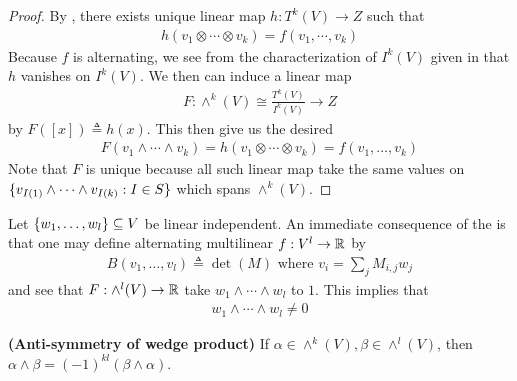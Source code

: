 \documentclass{report}
\begin{document}
\begin{proof}
By ,  there exists unique linear map $h:T^k(V)\rightarrow Z$ such that 
 \begin{align*}
h(v_1 \otimes  \cdots \otimes  v_k)=f(v_1,\cdots ,v_k)
\end{align*}
Because $f$ is alternating, we see from the characterization of $I^k(V)$ given in  that $h$ vanishes on $I^k(V)$. We then can induce a linear map 
\begin{align*}
F:\wedge^k (V)\cong \frac{T^k(V)}{I^k(V)} \rightarrow Z 
\end{align*}
by $F([x])\triangleq h(x)$. This then give us the desired  
\begin{align*}
F(v_1 \wedge  \cdots \wedge  v_k )=h(v_1\otimes  \cdots \otimes  v_k)=f(v_1,\dots ,v_k)
\end{align*}
Note that $F$ is unique because all such linear map take the same values on  $\{ v_{I(1)}\wedge  \cdots \wedge  v_{I(k)}:I \in S  \}$ which spans $\wedge ^k(V) $. 
\end{proof}
\begin{mdframed}
Let $\{ w_1,\dots ,w_l \}\subseteq V$ be linear independent. An immediate consequence of the  is that one may define alternating multilinear $f:V^l\rightarrow \mathbb{R}$ by 
\begin{align*}
B(v_1,\dots ,v_l)\triangleq \operatorname{det}(M)\text{ where }v_i= \sum_j M_{i,j}w_j
\end{align*}
and see that $F:\wedge^l (V)\rightarrow \mathbb{R} $ take $w_1\wedge  \cdots \wedge  w_l$ to $1$. This implies that  
\begin{align*}
w_1\wedge  \cdots \wedge  w_l \neq 0  
\end{align*}
\end{mdframed}
\begin{theorem}
\label{ASo}
\textbf{(Anti-symmetry of wedge product)} If $\alpha \in \wedge ^k (V),\beta \in \wedge ^l (V)  $, then $\alpha \wedge  \beta =(-1)^{kl}(\beta  \wedge  \alpha  )  $. 
\end{theorem}
\end{document}

